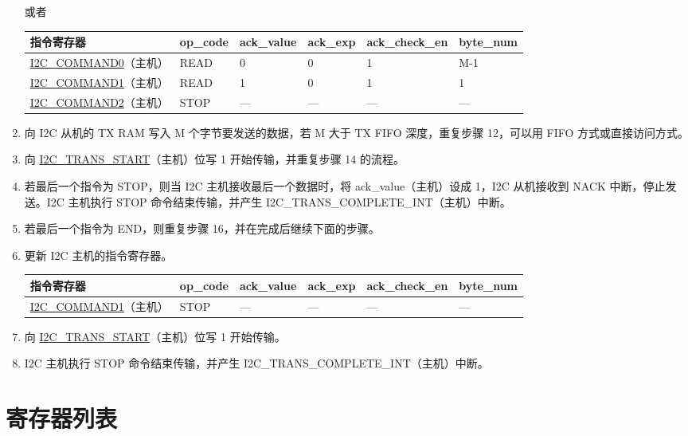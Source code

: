 \documentclass[main\_\_CN.tex]{subfiles}
\begin{document}
\begin{enumerate}
或者

\begin{longtable}{ | p{4cm} | p{2cm} | p{2cm} | p{2cm} |p{2cm} | p{2cm} |}
\hline\rowcolor{lightgray}
指令寄存器& op\_code & ack\_value&ack\_exp&ack\_check\_en&byte\_num  \\ \hline
\hyperref[fielddesc:I2CCOMMAND0]{I2C\_COMMAND0}（主机）& READ& 0&0&1&M-1  \\ \hline
\hyperref[fielddesc:I2CCOMMAND1]{I2C\_COMMAND1}（主机）& READ& 1&0&1&1  \\ \hline
\hyperref[fielddesc:I2CCOMMAND2]{I2C\_COMMAND2}（主机）& STOP& ---&---&---&---  \\ \hline
\end{longtable}

\item 向 I2C 从机的 TX RAM 写入 M 个字节要发送的数据，若 M 大于 TX FIFO 深度，重复步骤 12，可以用 FIFO 方式或直接访问方式。
\item 向 \hyperref[fielddesc:I2CTRANSSTART]{I2C\_TRANS\_START}（主机）位写 1 开始传输，并重复步骤 14 的流程。
\item 若最后一个指令为 STOP，则当 I2C 主机接收最后一个数据时，将 ack\_value（主机）设成 1，I2C 从机接收到 NACK 中断，停止发送。I2C 主机执行 STOP 命令结束传输，并产生 I2C\_TRANS\_COMPLETE\_INT（主机）中断。
\item 若最后一个指令为 END，则重复步骤 16，并在完成后继续下面的步骤。
\item 更新 I2C 主机的指令寄存器。

\begin{longtable}{ | p{4cm} | p{2cm} | p{2cm} | p{2cm} |p{2cm} | p{2cm} |}
\hline\rowcolor{lightgray}
指令寄存器& op\_code & ack\_value&ack\_exp&ack\_check\_en&byte\_num  \\ \hline
\hyperref[fielddesc:I2CCOMMAND1]{I2C\_COMMAND1}（主机）& STOP& ---&---&---&---  \\ \hline
\end{longtable}

\item 向 \hyperref[fielddesc:I2CTRANSSTART]{I2C\_TRANS\_START}（主机）位写 1 开始传输。
\item I2C 主机执行 STOP 命令结束传输，并产生 I2C\_TRANS\_COMPLETE\_INT（主机）中断。
\end{enumerate}



\newpage
\section{寄存器列表}
\end{document}
